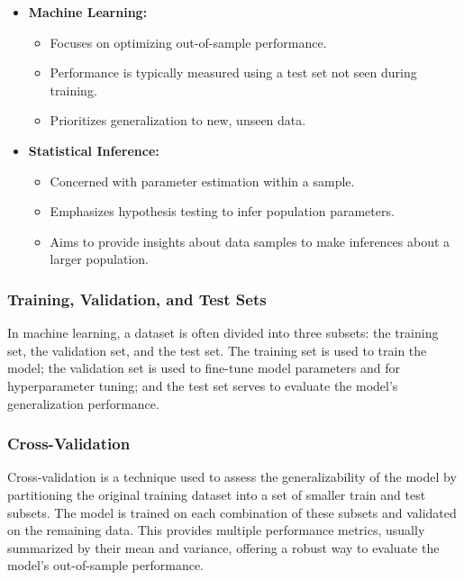 \begin{itemize}
    \item \textbf{Machine Learning:}
          \begin{itemize}
              \item Focuses on optimizing out-of-sample performance.
              \item Performance is typically measured using a test set not seen during training.
              \item Prioritizes generalization to new, unseen data.
          \end{itemize}
    \item \textbf{Statistical Inference:}
          \begin{itemize}
              \item Concerned with parameter estimation within a sample.
              \item Emphasizes hypothesis testing to infer population parameters.
              \item Aims to provide insights about data samples to make inferences about a larger population.
          \end{itemize}
\end{itemize}

\subsubsection{Training, Validation, and Test Sets}

In machine learning, a dataset is often divided into three subsets: the training set, the validation set, and the test set. The training set is used to train the model; the validation set is used to fine-tune model parameters and for hyperparameter tuning; and the test set serves to evaluate the model's generalization performance.

\subsubsection{Cross-Validation}

Cross-validation is a technique used to assess the generalizability of the model by partitioning the original training dataset into a set of smaller train and test subsets. The model is trained on each combination of these subsets and validated on the remaining data. This provides multiple performance metrics, usually summarized by their mean and variance, offering a robust way to evaluate the model's out-of-sample performance.

